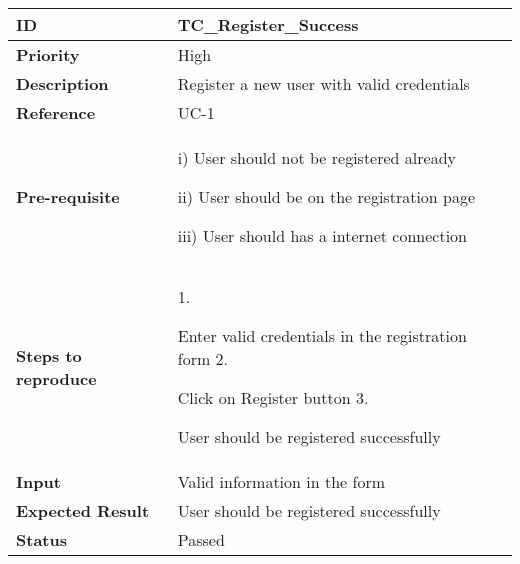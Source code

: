 
\begin{center}
    \begin{tabularx}{\textwidth}{|l|X|}
        \hline
        \textbf{ID}                 & TC\_Register\_Success                      \\
        \hline
        \textbf{Priority}           & High                                       \\
        \hline
        \textbf{Description}        & Register a new user with valid credentials \\
        \hline
        \textbf{Reference}          & UC-1                                       \\
        \hline
        \textbf{Pre-requisite}      & i) User should not be registered already

        ii) User should be on the registration page

        iii)  User should has a internet connection                              \\
        \hline
        \textbf{Steps to reproduce} & 1.

        Enter valid credentials in the registration form 2.

        Click on Register button 3.

        User should be registered successfully                                   \\
        \hline
        \textbf{Input}              & Valid information in the form              \\
        \hline
        \textbf{Expected Result}    & User should be registered successfully     \\
        \hline
        \textbf{Status}             & Passed                                     \\
        \hline
    \end{tabularx}
\end{center}
\vspace{5mm}



